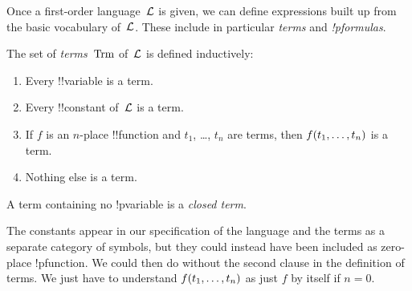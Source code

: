 \documentclass[../../include/open-logic-section]{subfiles}
\begin{document}


Once a first-order language~$\mathcal L$ is given, we can define
expressions built up from the basic vocabulary of~$\mathcal L$.  These
include in particular \emph{terms} and \emph{!p{formulas}}.

\begin{defn}[Term]
The set of \emph{terms}~$\Trm$ of~$\mathcal L$ is
defined inductively:
\begin{enumerate}
\item Every !!{variable} is a term.
\item Every !!{constant} of~$\mathcal L$ is a term.
\item If $f$ is an $n$-place !!{function} and $t_1$, \dots, $t_n$
  are terms, then $\mathord{f}(t_1, \ldots, t_n)$ is a term.
\item Nothing else is a term.
\end{enumerate}
A term containing no !p{variable} is a \emph{closed term}.
\end{defn}

\begin{explain}
The constants appear in our specification of the language and the
terms as a separate category of symbols, but they could instead have
been included as zero-place !p{function}.  We could then do
without the second clause in the definition of terms. We just have to
understand $\mathord{f}(t_1, \ldots, t_n)$ as just $f$ by itself if $n =
0$.
\end{explain}
\end{document}
